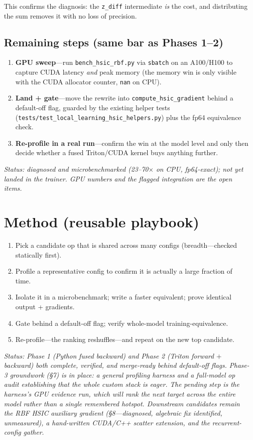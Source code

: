 \documentclass[11pt]{article}
\begin{document}
\noindent This confirms the diagnosis: the \texttt{z\_diff} intermediate \emph{is} the cost, and
distributing the sum removes it with no loss of precision.

\subsection*{Remaining steps (same bar as Phases 1--2)}
\begin{enumerate}[leftmargin=*, itemsep=1pt]
\item \textbf{GPU sweep}---run \texttt{bench\_hsic\_rbf.py} via \texttt{sbatch} on an A100/H100 to
capture CUDA latency \emph{and} peak memory (the memory win is only visible with the CUDA
allocator counter, \texttt{nan} on CPU).
\item \textbf{Land + gate}---move the rewrite into \texttt{compute\_hsic\_gradient} behind a
default-off flag, guarded by the existing helper tests
(\texttt{tests/test\_local\_learning\_hsic\_helpers.py}) plus the fp64 equivalence check.
\item \textbf{Re-profile in a real run}---confirm the win at the model level and only then decide
whether a fused Triton/CUDA kernel buys anything further.
\end{enumerate}
\noindent \emph{Status: diagnosed and microbenchmarked (23--70$\times$ on CPU, fp64-exact); not yet
landed in the trainer. GPU numbers and the flagged integration are the open items.}

\section*{Method (reusable playbook)}
\begin{enumerate}[leftmargin=*, itemsep=1pt]
\item Pick a candidate op that is shared across many configs (breadth---checked statically first).
\item Profile a representative config to confirm it is actually a large fraction of time.
\item Isolate it in a microbenchmark; write a faster equivalent; prove identical output + gradients.
\item Gate behind a default-off flag; verify whole-model training-equivalence.
\item Re-profile---the ranking reshuffles---and repeat on the new top candidate.
\end{enumerate}

\noindent \emph{Status: Phase 1 (Python fused backward) and Phase 2 (Triton forward $+$ backward)
both complete, verified, and merge-ready behind default-off flags. Phase-3 groundwork (\S7) is in
place: a general profiling harness and a full-model op audit establishing that the whole custom
stack is eager. The pending step is the harness's GPU evidence run, which will rank the next
target across the entire model rather than a single remembered hotspot. Downstream candidates
remain the RBF HSIC auxiliary gradient (\S8---diagnosed, algebraic fix identified, unmeasured), a
hand-written CUDA/C++ scatter extension, and the recurrent-config gather.}
\end{document}

